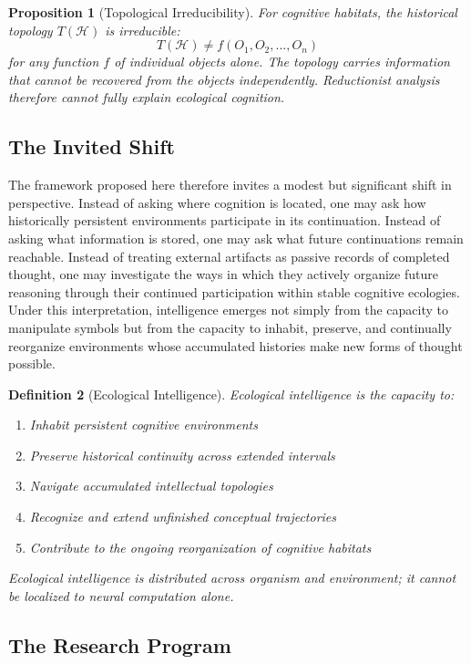 \documentclass[12pt,oneside]{article}
\newtheorem{definition}{Definition}[section]
\newtheorem{proposition}[definition]{Proposition}
\theoremstyle{remark}
\begin{document}
\begin{proposition}[Topological Irreducibility]
For cognitive habitats, the historical topology \(T(\mathcal{H})\) is irreducible:
\[
T(\mathcal{H}) \neq f(O_1, O_2, \ldots, O_n)
\]
for any function \(f\) of individual objects alone. The topology carries information that cannot be recovered from the objects independently. Reductionist analysis therefore cannot fully explain ecological cognition.
\end{proposition}

\subsection{The Invited Shift}

The framework proposed here therefore invites a modest but significant shift in perspective. Instead of asking where cognition is located, one may ask how historically persistent environments participate in its continuation. Instead of asking what information is stored, one may ask what future continuations remain reachable. Instead of treating external artifacts as passive records of completed thought, one may investigate the ways in which they actively organize future reasoning through their continued participation within stable cognitive ecologies. Under this interpretation, intelligence emerges not simply from the capacity to manipulate symbols but from the capacity to inhabit, preserve, and continually reorganize environments whose accumulated histories make new forms of thought possible.

\begin{definition}[Ecological Intelligence]
Ecological intelligence is the capacity to:
\begin{enumerate}
\item Inhabit persistent cognitive environments
\item Preserve historical continuity across extended intervals
\item Navigate accumulated intellectual topologies
\item Recognize and extend unfinished conceptual trajectories
\item Contribute to the ongoing reorganization of cognitive habitats
\end{enumerate}
Ecological intelligence is distributed across organism and environment; it cannot be localized to neural computation alone.
\end{definition}

\subsection{The Research Program}
\end{document}
